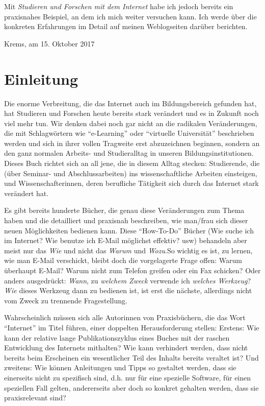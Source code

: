 \documentclass[]{book}
\theoremstyle{definition}
\theoremstyle{definition}
\theoremstyle{definition}
\theoremstyle{remark}
\begin{document}
Mit \emph{Studieren und Forschen mit dem Internet} habe ich jedoch
bereits ein praxisnahes Beispiel, an dem ich mich weiter versuchen kann.
Ich werde über die konkreten Erfahrungen im Detail auf meinen
Weblogseiten darüber berichten.

Krems, am 15. Oktober 2017

\chapter*{Einleitung}\label{einleitung}

Die enorme Verbreitung, die das Internet auch im Bildungsbereich
gefunden hat, hat Studieren und Forschen heute bereits stark verändert
und es in Zukunft noch viel mehr tun. Wir denken dabei noch gar nicht an
die radikalen Veränderungen, die mit Schlagwörtern wie ``e-Learning''
oder ``virtuelle Universität'' beschrieben werden und sich in ihrer
vollen Tragweite erst abzuzeichnen beginnen, sondern an den ganz
normalen Arbeits- und Studieralltag in unseren Bildungsinstitutionen.
Dieses Buch richtet sich an all jene, die in diesem Alltag stecken:
Studierende, die (über Seminar- und Abschlussarbeiten) ins
wissenschaftliche Arbeiten einsteigen, und Wissenschafterinnen, deren
berufliche Tätigkeit sich durch das Internet stark verändert hat.

Es gibt bereits hunderte Bücher, die genau diese Veränderungen zum Thema
haben und die detailliert und praxisnah beschreiben, wie man/frau sich
dieser neuen Möglichkeiten bedienen kann. Diese ``How-To-Do'' Bücher
(Wie suche ich im Internet? Wie benutze ich E-Mail möglichst effektiv?
usw) behandeln aber meist nur das \emph{Wie} und nicht das \emph{Warum}
und \emph{Wozu}.So wichtig es ist, zu lernen, wie man E-Mail verschickt,
bleibt doch die vorgelagerte Frage offen: Warum überhaupt E-Mail? Warum
nicht zum Telefon greifen oder ein Fax schicken? Oder anders
ausgedrückt: \emph{Wann}, zu \emph{welchem Zweck} verwende ich
\emph{welches Werkzeug}? \emph{Wie} dieses Werkzeug dann zu bedienen
ist, ist erst die nächste, allerdings nicht vom Zweck zu trennende
Fragestellung.

Wahrscheinlich müssen sich alle Autorinnen von Praxisbüchern, die das
Wort ``Internet'' im Titel führen, einer doppelten Herausforderung
stellen: Erstens: Wie kann der relative lange Publikationszyklus eines
Buches mit der raschen Entwicklung des Internets mithalten? Wie kann
verhindert werden, dass nicht bereits beim Erscheinen ein wesentlicher
Teil des Inhalts bereits veraltet ist? Und zweitens: Wie können
Anleitungen und Tipps so gestaltet werden, dass sie einerseits nicht zu
spezifisch sind, d.h. nur für eine spezielle Software, für einen
speziellen Fall gelten, andererseits aber doch so konkret gehalten
werden, dass sie praxisrelevant sind?
\end{document}
